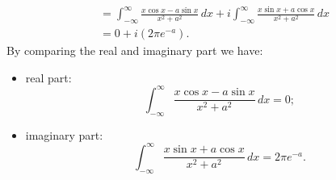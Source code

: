 \documentclass[12pt, a4paper]{article}
\begin{document}
\begin{example}
\begin{solution}
\[\begin{aligned}
            &= \int_{-\infty}^{\infty} \frac{x\cos x-a\sin x}{x^2+a^2} \, dx + i \int_{-\infty}^{\infty} \frac{x\sin x+a\cos x}{x^2+a^2} \, dx \\
            &= 0+i(2\pi e^{-a}).
        \end{aligned}\]
        By comparing the real and imaginary part we have:
        \begin{itemize}
            \item real part:
            \[\int_{-\infty}^{\infty} \frac{x\cos x-a\sin x}{x^2+a^2} \, dx = 0;\]
            \item imaginary part:
            \[\int_{-\infty}^{\infty} \frac{x\sin x+a\cos x}{x^2+a^2} \, dx = 2\pi e^{-a}.\]
        \end{itemize}
    \end{solution}
\end{example}

\end{document}
